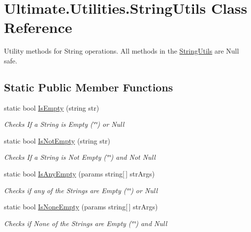 \hypertarget{class_ultimate_1_1_utilities_1_1_string_utils}{}\section{Ultimate.\+Utilities.\+String\+Utils Class Reference}
\label{class_ultimate_1_1_utilities_1_1_string_utils}


Utility methods for String operations. All methods in the \hyperlink{class_ultimate_1_1_utilities_1_1_string_utils}{String\+Utils} are Null safe.  


\subsection*{Static Public Member Functions}
\begin{DoxyCompactItemize}
\item 
static bool \hyperlink{class_ultimate_1_1_utilities_1_1_string_utils_afbc80de9fa79432d4422baac1497efaa}{Is\+Empty} (string str)
\begin{DoxyCompactList}\small\item\em Checks If a String is Empty (\char`\"{}\char`\"{}) or Null \end{DoxyCompactList}\item 
static bool \hyperlink{class_ultimate_1_1_utilities_1_1_string_utils_a1ce9512184f90b5f81ae1d48ddc3d944}{Is\+Not\+Empty} (string str)
\begin{DoxyCompactList}\small\item\em Checks If a String is Not Empty (\char`\"{}\char`\"{}) and Not Null \end{DoxyCompactList}\item 
static bool \hyperlink{class_ultimate_1_1_utilities_1_1_string_utils_a4001e7d2b45c059e559dea2b44c739f7}{Is\+Any\+Empty} (params string\mbox{[}$\,$\mbox{]} str\+Args)
\begin{DoxyCompactList}\small\item\em Checks if any of the Strings are Empty (\char`\"{}\char`\"{}) or Null \end{DoxyCompactList}\item 
static bool \hyperlink{class_ultimate_1_1_utilities_1_1_string_utils_a5ed89759d5b9f0d538877b66b9794f10}{Is\+None\+Empty} (params string\mbox{[}$\,$\mbox{]} str\+Args)
\begin{DoxyCompactList}\small\item\em Checks if None of the Strings are Empty (\char`\"{}\char`\"{}) and Null \end{DoxyCompactList}\item 

\end{DoxyCompactItemize}
